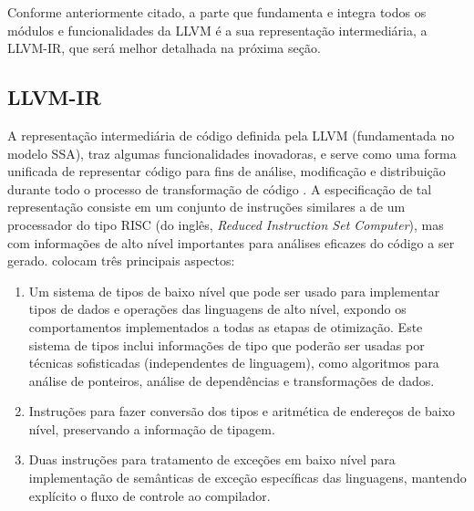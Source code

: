 
Conforme anteriormente citado, a parte que fundamenta e integra todos os módulos e funcionalidades da LLVM é a sua representação intermediária, a LLVM-IR, que será melhor detalhada na próxima seção.

\subsection{LLVM-IR}\label{sec:llvm-ir}

A representação intermediária de código definida pela LLVM (fundamentada no modelo SSA), traz algumas funcionalidades inovadoras, e serve como uma forma unificada de representar código para fins de análise, modificação e distribuição durante todo o processo de transformação de código \cite{lattner2004llvm}. A especificação de tal representação consiste em um conjunto de instruções similares a de um processador do tipo RISC (do inglês, \emph{Reduced Instruction Set Computer}), mas com informações de alto nível importantes para análises eficazes do código a ser gerado.  colocam três principais aspectos:

\begin{enumerate}
    \item[(a)] Um sistema de tipos de baixo nível que pode ser usado para implementar tipos de dados e operações das linguagens de alto nível, expondo os comportamentos implementados a todas as etapas de otimização. Este sistema de tipos inclui informações de tipo que poderão ser usadas por técnicas sofisticadas (independentes de linguagem), como algoritmos para análise de ponteiros, análise de dependências e transformações de dados.
    \item[(b)] Instruções para fazer conversão dos tipos e aritmética de endereços de baixo nível, preservando a informação de tipagem.
    \item[(c)] Duas instruções para tratamento de exceções em baixo nível para implementação de semânticas de exceção específicas das linguagens, mantendo explícito o fluxo de controle ao compilador. 
\end{enumerate}

